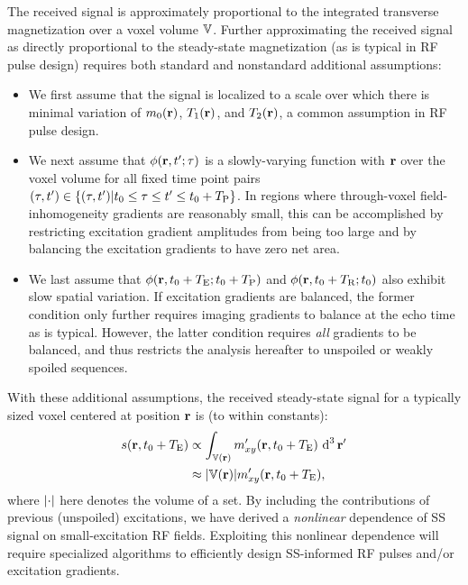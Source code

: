 The received signal is approximately proportional
to the integrated transverse magnetization 
over a voxel volume $\mathbb{V}$. 
Further approximating the received signal
as directly proportional 
to the steady-state magnetization
(as is typical in RF pulse design)
requires both standard and nonstandard additional assumptions:
\begin{itemize}
	\item{%
		We first assume 
		that the signal is localized
		to a scale over which 
		there is minimal variation
		of $\mzero\pr$, $\To\pr$, and $\Tt\pr$,
		a common assumption
		in RF pulse design.
	}%
	\item{%
		We next assume 
		that $\phi(\mathbf{r}, t'; \tau)$ 
		is a slowly-varying function with $\mathbf{r}$
		over the voxel volume
		for all fixed time point pairs 
		$(\tau, t') \in \set{(\tau, t') | t_0 \le \tau \le t' \le t_0 + \TP}$. 
		In regions where through-voxel field-inhomogeneity gradients are reasonably small, 
		this can be accomplished by restricting excitation gradient amplitudes 
		from being too large 
		and by balancing the excitation gradients 
		to have zero net area.
	}%
	\item{%
		We last assume
		that $\phi(\mathbf{r}, t_0 + T_\mathrm{E}; t_0 + T_\mathrm{P})$ 
		and $\phi(\mathbf{r}, t_0 + T_\mathrm{R}; t_0)$ 
		also exhibit slow spatial variation. 
		If excitation gradients are balanced, 
		the former condition only further requires imaging gradients 
		to balance at the echo time
		as is typical. 
		However,
		the latter condition 
		requires \emph{all} gradients to be balanced, 
		and thus restricts the analysis hereafter 
		to unspoiled or weakly spoiled sequences.
	}%
\end{itemize}
With these additional assumptions,
the received steady-state signal
for a typically sized voxel
centered at position $\mathbf{r}$
is (to within constants):
\begin{align}
	s(\bmr,t_0+\TE) 
		&\propto 
			\int_{\setV\pr} \mxyp(\bmr, t_0+\TE) \dercubed \bmr'
			\label{eq:ss-rf,s}
			\\
		&\approx
			\abs{\setV\pr} \mxyp(\bmr, t_0+\TE),
			\label{eq:ss-rf,s-apprx}
\end{align}
where $\abs{\cdot}$ here denotes the volume of a set.
By including the contributions of previous (unspoiled) excitations, 
we have derived a \emph{nonlinear} dependence
of SS signal on small-excitation RF fields.
Exploiting this nonlinear dependence
will require specialized algorithms
to efficiently design SS-informed RF pulses 
and/or excitation gradients.

